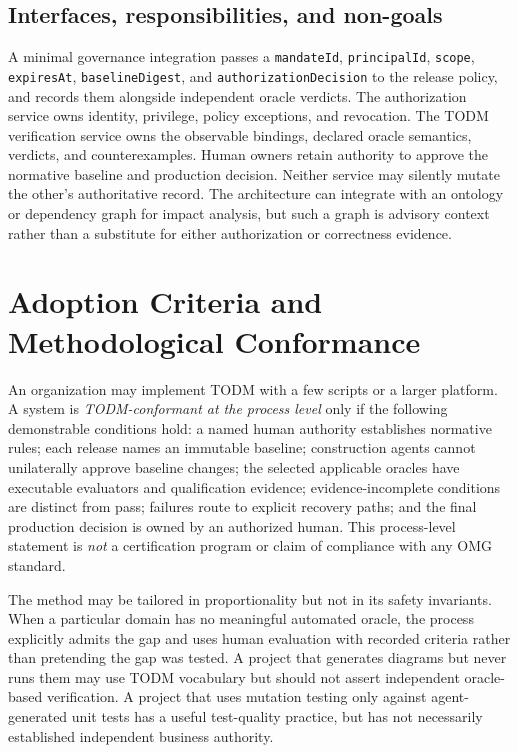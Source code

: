 \documentclass[11pt,a4paper]{article}
\begin{document}
\subsection{Interfaces, responsibilities, and non-goals}
A minimal governance integration passes a \texttt{mandateId}, \texttt{principalId}, \texttt{scope}, \texttt{expiresAt}, \texttt{baselineDigest}, and \texttt{authorizationDecision} to the release policy, and records them alongside independent oracle verdicts. The authorization service owns identity, privilege, policy exceptions, and revocation. The TODM verification service owns the observable bindings, declared oracle semantics, verdicts, and counterexamples. Human owners retain authority to approve the normative baseline and production decision. Neither service may silently mutate the other's authoritative record. The architecture can integrate with an ontology or dependency graph for impact analysis, but such a graph is advisory context rather than a substitute for either authorization or correctness evidence.

\section{Adoption Criteria and Methodological Conformance}
An organization may implement TODM with a few scripts or a larger platform. A system is \emph{TODM-conformant at the process level} only if the following demonstrable conditions hold: a named human authority establishes normative rules; each release names an immutable baseline; construction agents cannot unilaterally approve baseline changes; the selected applicable oracles have executable evaluators and qualification evidence; evidence-incomplete conditions are distinct from pass; failures route to explicit recovery paths; and the final production decision is owned by an authorized human. This process-level statement is \emph{not} a certification program or claim of compliance with any OMG standard.

The method may be tailored in proportionality but not in its safety invariants. When a particular domain has no meaningful automated oracle, the process explicitly admits the gap and uses human evaluation with recorded criteria rather than pretending the gap was tested. A project that generates diagrams but never runs them may use TODM vocabulary but should not assert independent oracle-based verification. A project that uses mutation testing only against agent-generated unit tests has a useful test-quality practice, but has not necessarily established independent business authority.
\end{document}
